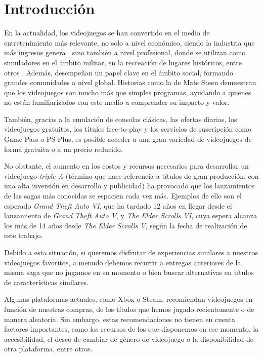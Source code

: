 
\chapter{Introducción}

En la actualidad, los videojuegos se han convertido en el medio de entretenimiento más relevante, no solo a nivel económico, siendo la industria que más ingresos genera \cite{Videojuegos_economia}, sino también a nivel profesional, donde se utilizan como simuladores en el ámbito militar, en la recreación de lugares históricos, entre otros \cite{videojuegos_profesional}. Además, desempeñan un papel clave en el ámbito social, formando grandes comunidades a nivel global. Historias como la de Mats Steen \cite{wow} demuestran que los videojuegos son mucho más que simples programas, ayudando a quienes no están familiarizados con este medio a comprender su impacto y valor.  


También, gracias a la emulación de consolas clásicas, las ofertas diarias, los videojuegos gratuitos, los títulos free-to-play y los servicios de suscripción como Game Pass o PS Plus, es posible acceder a una gran variedad de videojuegos de forma gratuita o a un precio reducido.  


No obstante, el aumento en los costos y recursos necesarios para desarrollar un videojuego \textit{triple A} (término que hace referencia a títulos de gran producción, con una alta inversión en desarrollo y publicidad) ha provocado que los lanzamientos de las sagas más conocidas se espacien cada vez más. Ejemplos de ello son el esperado \textit{Grand Theft Auto VI}, que ha tardado 12 años en llegar desde el lanzamiento de \textit{Grand Theft Auto V}, y \textit{The Elder Scrolls VI}, cuya espera alcanza los más de 14 años desde \textit{The Elder Scrolls V}, según la fecha de realización de este trabajo.  


Debido a esta situación, si queremos disfrutar de experiencias similares a nuestros videojuegos favoritos, a menudo debemos recurrir a entregas anteriores de la misma saga que no jugamos en su momento o bien buscar alternativas en títulos de características similares.  


Algunas plataformas actuales, como Xbox o Steam, recomiendan videojuegos en función de nuestras compras, de los títulos que hemos jugado recientemente o de manera aleatoria. Sin embargo, estas recomendaciones no tienen en cuenta factores importantes, como los recursos de los que disponemos en ese momento, la accesibilidad, el deseo de cambiar de género de videojuego o la disponibilidad de otra plataforma, entre otros.  


